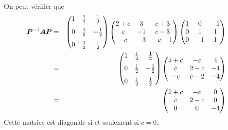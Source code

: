 On peut vérifier que
\begin{eqnarray*}
\boldsymbol{P}^{-1}\boldsymbol{A}\boldsymbol{P} &=& 
\begin{pmatrix}
 1 & \frac12 & \frac12\\[7pt]
 0 & \frac12 & -\frac12\\[7pt]
0 &\frac12 & \frac12
\end{pmatrix}
\begin{pmatrix}
2+c & 3 & c+3 \\
c & -1 & c-3 \\
-c & -3 & -c-1
\end{pmatrix}
\begin{pmatrix}
1 & 0 & -1 \\
0 & 1 & 1 \\
0 & -1 & 1 
\end{pmatrix}\\
&=&
\begin{pmatrix}
 1 & \frac12 & \frac12\\[7pt]
 0 & \frac12 & -\frac12\\[7pt]
0 &\frac12 & \frac12
\end{pmatrix}
\begin{pmatrix}
2+c & -c & 4 \\
c & 2-c & -4 \\
-c & c-2 & -4
\end{pmatrix}\\
&=&
\begin{pmatrix}
2+c & -c & 0 \\
c & 2-c & 0 \\
0 & 0 & -4
\end{pmatrix}
\end{eqnarray*}
Cette matrice est diagonale si et seulement si $c=0$.

